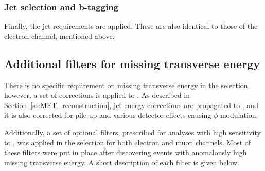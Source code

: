 \subsubsection*{Jet selection and b-tagging}
Finally, the jet requirements are applied. These are also identical to those of the electron channel, mentioned above.


\subsection{Additional filters for missing transverse energy}
\label{ss_xsection:met_filters}

There is no specific requirement on missing transverse energy in the selection, however, a set of corrections is applied
to \MET. As described in Section~\ref{ss:MET_reconstruction}, jet energy corrections are propagated to \MET, and it is
also corrected for pile-up and various detector effects causing $\phi$ modulation.

Additionally, a set of optional filters, prescribed for analyses with high sensitivity to \MET, was applied in the
selection for both electron and muon channels. Most of these filters were put in place after discovering events with
anomalously high missing transverse energy. A short description of each filter is given below.


